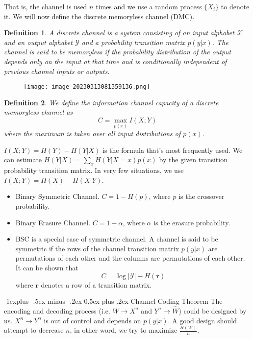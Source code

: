 \documentclass[10pt,landscape, a4paper]{article}
\makeatletter
\newtheorem{definition}{Definition}
\renewcommand{\subsection}{\@startsection{subsection}{2}{0mm}%
                                {-1explus -.5ex minus -.2ex}%
                                {0.5ex plus .2ex}%
                                {\normalfont\normalsize\bfseries}}
\makeatother
\begin{document}
\begin{multicols}{3}
That is, the channel is used $n$ times and we use a random process $\{X_i\}$ to denote it. We will now define the discrete memoryless channel (DMC).
\begin{definition}
    A discrete channel is a system consisting of an input alphabet $\mathcal{X}$ and an output alphabet $\mathcal{Y}$ and a probability transition matrix $p(y|x)$. The channel is said to be memoryless if the probability distribution of the output depends only on the input at that time and is conditionally independent of previous channel inputs or outputs.
\end{definition}

\begin{figure}[H]
    \centering
    \texttt{[image: image-20230313081359136.png]}
\end{figure}

\begin{definition}
    We define the information channel capacity of a discrete memoryless channel as
    $$
    C=\max_{p(x)}I(X;Y)
    $$
    where the maximum is taken over all input distributions of $p(x)$.
\end{definition}

$I(X;Y)=H(Y)-H(Y|X)$ is the formula that's most frequently used. We can estimate $H(Y|X)=\sum_x H(Y|X=x)p(x)$ by the given transition probability transition matrix. In very few situations, we use $I(X;Y)=H(X)-H(X|Y)$.

\begin{itemize}
    \item Binary Symmetric Channel. $C=1-H(p)$, where $p$ is the crossover probability.
    \item Binary Erasure Channel. $C=1-\alpha$, where $\alpha$ is the erasure probability.
    \item BSC is a special case of symmetric channel. A channel is said to be symmetric if the rows of the channel transition matrix $p(y|x)$ are permutations of each other and the columns are permutations of each other. It can be shown that
    $$
    C=\log |\mathcal{Y}|-H(\mathbf{r})
    $$
    where $\mathbf{r}$ denotes a row of a transition matrix.
\end{itemize}

\subsection{Channel Coding Theorem}
The encoding and decoding process (i.e. $W\rightarrow X^n$ and $Y^n\rightarrow \hat{W}$) could be designed by us. $X^n\rightarrow Y^n$ is out of control and depends on $p(y|x)$. A good design should attempt to decrease $n$, in other word, we try to maximize $\frac{H(W)}{n}$.


\end{multicols}
\end{document}
